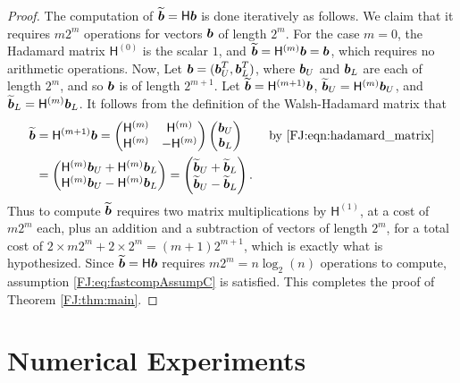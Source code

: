 \documentclass[graybox,footinfo]{svmult}
\begin{document}
\begin{proof}
The computation of $\widetilde{{\boldsymbol{b}}} =\mathsf{H} {\boldsymbol{b}}$ is done iteratively as follows.  We claim that it requires $m2^m$ operations for vectors ${\boldsymbol{b}}$ of length $2^m$. For the case $m=0$, the Hadamard matrix $\mathsf{H}^{(0)}$ is the scalar $1$, and $\widetilde{{\boldsymbol{b}}} = \mathsf{H}^{(m)} {\boldsymbol{b}} = {\boldsymbol{b}}$, which requires no arithmetic operations.  Now, Let ${\boldsymbol{b}} = ({\boldsymbol{b}}_U^{T},  {\boldsymbol{b}}_L^{T})$, where ${\boldsymbol{b}}_U$ and ${\boldsymbol{b}}_L$ are each of length $2^m$, and so ${\boldsymbol{b}}$ is of length $2^{m+1}$.  Let $\widetilde{{\boldsymbol{b}}} = \mathsf{H}^{(m+1)} {\boldsymbol{b}}$,  $\widetilde{{\boldsymbol{b}}}_U = \mathsf{H}^{(m)} {\boldsymbol{b}}_U$, and $\widetilde{{\boldsymbol{b}}}_L = \mathsf{H}^{(m)} {\boldsymbol{b}}_L$.  It follows from the definition of the Walsh-Hadamard matrix that 
\begin{align*}
\widetilde{{\boldsymbol{b}}} &= \mathsf{H}^{({m+1})} {\boldsymbol{b}} = \begin{pmatrix}
\mathsf{H}^{(m)} & \mathsf{H}^{(m)} \\ \mathsf{H}^{(m)} & - \mathsf{H}^{(m)}
\end{pmatrix} 
\begin{pmatrix}
{\boldsymbol{b}}_U\\ {\boldsymbol{b}}_L
\end{pmatrix} \qquad \text{by \eqref{FJ:eqn:hadamard_matrix}} \\
&= 
\begin{pmatrix}
\mathsf{H}^{(m)} {\boldsymbol{b}}_U + \mathsf{H}^{(m)}{\boldsymbol{b}}_L \\ 
\mathsf{H}^{(m)} {\boldsymbol{b}}_U - \mathsf{H}^{(m)} {\boldsymbol{b}}_L
\end{pmatrix}
= 
\begin{pmatrix}
\widetilde{{\boldsymbol{b}}}_U + \widetilde{{\boldsymbol{b}}}_L \\ 
\widetilde{{\boldsymbol{b}}}_U - \widetilde{{\boldsymbol{b}}}_L
\end{pmatrix}.
\end{align*}
Thus to compute $\widetilde{{\boldsymbol{b}}}$ requires two matrix multiplications by $\mathsf{H}^{(1)}$, at a cost of $m 2^m$ each, plus an addition and a subtraction of vectors of length $2^m$, for a total cost of $2 \times m 2^m + 2 \times 2^m = (m+1) 2^{m+1}$, which is exactly what is hypothesized.  Since $\widetilde{{\boldsymbol{b}}} =\mathsf{H} {\boldsymbol{b}}$ requires $m2^m = n \log_2(n)$ operations to compute, assumption \eqref{FJ:eq:fastcompAssumpC} is satisfied.  This completes the proof of Theorem \ref{FJ:thm:main}.

\end{proof}




\section{Numerical Experiments}
\end{document}

